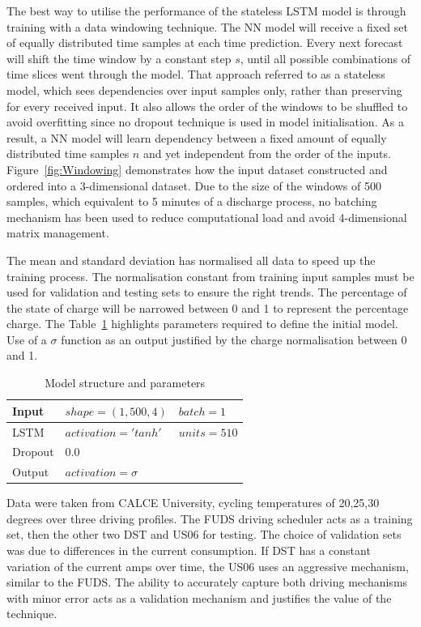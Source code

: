 %
%
The best way to utilise the performance of the stateless LSTM model is through training with a data windowing technique.
The NN model will receive a fixed set of equally distributed time samples at each time prediction.
Every next forecast will shift the time window by a constant step $s$, until all possible combinations of time slices went through the model.
That approach referred to as a stateless model, which sees dependencies over input samples only, rather than preserving for every received input.
It also allows the order of the windows to be shuffled to avoid overfitting since no dropout technique is used in model initialisation.
As a result, a NN model will learn dependency between a fixed amount of equally distributed time samples $n$ and yet independent from the order of the inputs.
Figure~\ref{fig:Windowing} demonstrates how the input dataset constructed and ordered into a 3-dimensional dataset.
Due to the size of the windows of 500 samples, which equivalent to 5 minutes of a discharge process, no batching mechanism has been used to reduce computational load and avoid 4-dimensional matrix management.


%
%
The mean and standard deviation has normalised all data to speed up the training process.
The normalisation constant from training input samples must be used for validation and testing sets to ensure the right trends.
The percentage of the state of charge will be narrowed between 0 and 1 to represent the percentage charge.
The Table~\ref{tab:params} highlights parameters required to define the initial model.
Use of a $\sigma$ function as an output justified by the charge normalisation between 0 and 1.
\begin{table}[ht]
    \centering
    \caption{Model structure and parameters}
    \label{tab:params}
    \begin{tabular}{ p{3.0cm} p{3.5cm} p{2.5cm}   }
        \hline
        Input     & $shape=(1,500,4)$ & $batch=1 $  \\
        \hline
        LSTM      & $activation= 'tanh'$ & $units=510$  \\
        \hline
        Dropout   & $0.0$ &   \\
        \hline
        Output    & $activation= \sigma$ &   \\
        \hline
    \end{tabular}
\end{table}

%
%
Data were taken from CALCE University, cycling temperatures of 20,25,30 degrees over three driving profiles.
The FUDS driving scheduler acts as a training set, then the other two DST and US06 for testing.
The choice of validation sets was due to differences in the current consumption.
If DST has a constant variation of the current amps over time, the US06 uses an aggressive mechanism, similar to the FUDS.
The ability to accurately capture both driving mechanisms with minor error acts as a validation mechanism and justifies the value of the technique.

